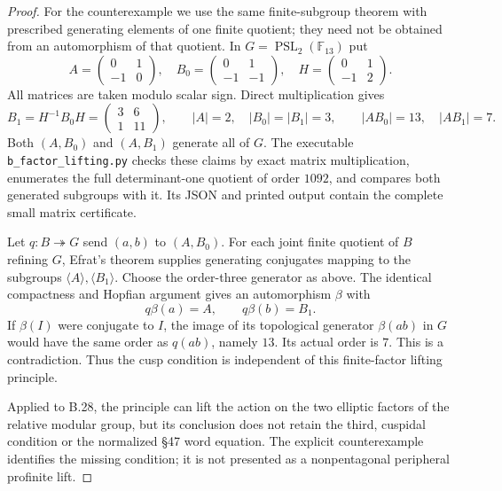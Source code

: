 \begin{proof}
For the counterexample we use the same finite-subgroup theorem
with prescribed generating elements of one finite quotient;
they need not be obtained from an automorphism of that quotient.
In $G=\operatorname{PSL}_2(\mathbb F_{13})$ put
\[
 A=\begin{pmatrix}0&1\\-1&0\end{pmatrix},\quad
 B_0=\begin{pmatrix}0&1\\-1&-1\end{pmatrix},\quad
 H=\begin{pmatrix}0&1\\-1&2\end{pmatrix}.
\]
All matrices are taken modulo scalar sign. Direct multiplication
gives
\[
 B_1=H^{-1}B_0H=
      \begin{pmatrix}3&6\\1&11\end{pmatrix},
 \qquad
 |A|=2,\quad |B_0|=|B_1|=3,
 \qquad |AB_0|=13,\quad |AB_1|=7.
\]
Both $(A,B_0)$ and $(A,B_1)$ generate all of $G$.
The executable \texttt{b\_factor\_lifting.py} checks these
claims by exact matrix multiplication, enumerates the full
determinant-one quotient of order $1092$, and compares both
generated subgroups with it. Its JSON and printed output
contain the complete small matrix certificate.

Let $q:B\twoheadrightarrow G$ send $(a,b)$ to $(A,B_0)$.
For each joint finite quotient of $B$ refining $G$, Efrat's
theorem supplies generating conjugates mapping to the subgroups
$\langle A\rangle,\langle B_1\rangle$. Choose the order-three
generator as above. The identical compactness and Hopfian
argument gives an automorphism $\beta$ with
\[
                    q\beta(a)=A,\qquad q\beta(b)=B_1.
\]
If $\beta(I)$ were conjugate to $I$, the image of its topological
generator $\beta(ab)$ in $G$ would have the same order as
$q(ab)$, namely $13$. Its actual order is $7$. This is a
contradiction. Thus the cusp condition is independent of this
finite-factor lifting principle.

Applied to B.28, the principle can lift the action on the two
elliptic factors of the relative modular group, but its conclusion
does not retain the third, cuspidal condition or the normalized
\S47 word equation. The explicit counterexample identifies the
missing condition; it is not presented as a nonpentagonal
peripheral profinite lift.
\end{proof}
